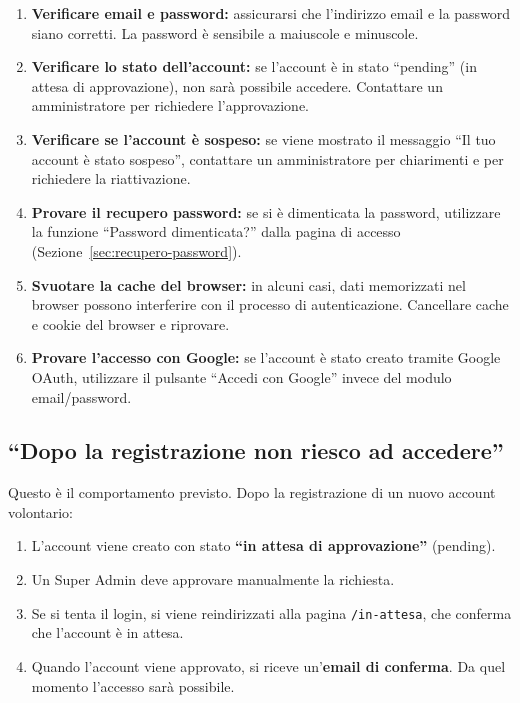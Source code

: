 \documentclass[a4paper,11pt,oneside]{book}
\newcommand{\percorso}[1]{\textcolor{namoCyan}{\texttt{#1}}}
\begin{document}
\begin{enumerate}[leftmargin=1.5em]
  \item \textbf{Verificare email e password:} assicurarsi che l'indirizzo email e la password siano corretti. La password \`e sensibile a maiuscole e minuscole.
  \item \textbf{Verificare lo stato dell'account:} se l'account \`e in stato ``pending'' (in attesa di approvazione), non sar\`a possibile accedere. Contattare un amministratore per richiedere l'approvazione.
  \item \textbf{Verificare se l'account \`e sospeso:} se viene mostrato il messaggio ``Il tuo account \`e stato sospeso'', contattare un amministratore per chiarimenti e per richiedere la riattivazione.
  \item \textbf{Provare il recupero password:} se si \`e dimenticata la password, utilizzare la funzione ``Password dimenticata?'' dalla pagina di accesso (Sezione~\ref{sec:recupero-password}).
  \item \textbf{Svuotare la cache del browser:} in alcuni casi, dati memorizzati nel browser possono interferire con il processo di autenticazione. Cancellare cache e cookie del browser e riprovare.
  \item \textbf{Provare l'accesso con Google:} se l'account \`e stato creato tramite Google OAuth, utilizzare il pulsante ``Accedi con Google'' invece del modulo email/password.
\end{enumerate}

\subsection{``Dopo la registrazione non riesco ad accedere''}

Questo \`e il comportamento previsto. Dopo la registrazione di un nuovo account volontario:

\begin{enumerate}[leftmargin=1.5em]
  \item L'account viene creato con stato \textbf{``in attesa di approvazione''} (pending).
  \item Un Super Admin deve approvare manualmente la richiesta.
  \item Se si tenta il login, si viene reindirizzati alla pagina \percorso{/in-attesa}, che conferma che l'account \`e in attesa.
  \item Quando l'account viene approvato, si riceve un'\textbf{email di conferma}. Da quel momento l'accesso sar\`a possibile.
\end{enumerate}
\end{document}
